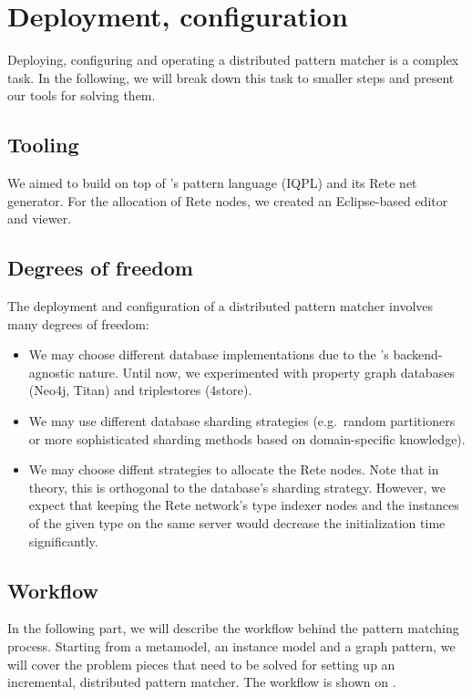 \section{Deployment, configuration}
\label{sec:deployment-configuration}

Deploying, configuring and operating a distributed pattern matcher is a complex task. In the following, we will break down this task to smaller steps and present our tools for solving them. 

\subsection{Tooling}

We aimed to build \iqd{} on top of \eiq{}'s pattern language (IQPL) and its Rete net generator. For the allocation of Rete nodes, we created an Eclipse-based editor and viewer.

\subsection{Degrees of freedom}

The deployment and configuration of a distributed pattern matcher involves many degrees of freedom:

\begin{itemize}
  \item We may choose different database implementations due to the \iqd{}'s backend-agnostic nature. Until now, we experimented with property graph databases (Neo4j, Titan) and triplestores (4store).
  \item We may use different database sharding strategies (e.g.\ random partitioners or more sophisticated sharding methods based on domain-specific knowledge).
  \item We may choose diffent strategies to allocate the Rete nodes. Note that in theory, this is orthogonal to the database's sharding strategy. However, we expect that keeping the Rete network's type indexer nodes and the instances of the given type on the same server would decrease the initialization time significantly.
\end{itemize}
 
\subsection{Workflow}
\label{subsec:workflow}
 
In the following part, we will describe the workflow behind the pattern matching process. Starting from a metamodel, an instance model and a graph pattern, we will cover the problem pieces that need to be solved for setting up an incremental, distributed pattern matcher. The workflow is shown on .

